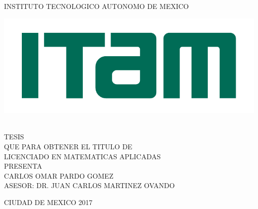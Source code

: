 \begin{titlepage}
\begin{center}

\large{INSTITUTO TECNOLOGICO AUTONOMO DE MEXICO}\\[2em]
\hline

\begin{center}
	\includegraphics{Figures/Miscellaneous/logo-ITAM.pdf}
\end{center}

\vspace{1em}

{}\\[2em]

\textsc{\large TESIS}\\[1em]

\textsc{\normalsize QUE PARA OBTENER EL TITULO DE}\\[1em]

\textsc{\normalsize LICENCIADO EN MATEMATICAS APLICADAS}\\[1em]

\textsc{\normalsize PRESENTA}\\[1em]

\textsc{\Large CARLOS OMAR PARDO GOMEZ}\\[3em]

\textsc{\normalsize ASESOR: DR. JUAN CARLOS MARTINEZ OVANDO}

\end{center}

\vspace*{\fill}
\textsc{CIUDAD DE MEXICO \hspace*{\fill} 2017}

\end{titlepage}
